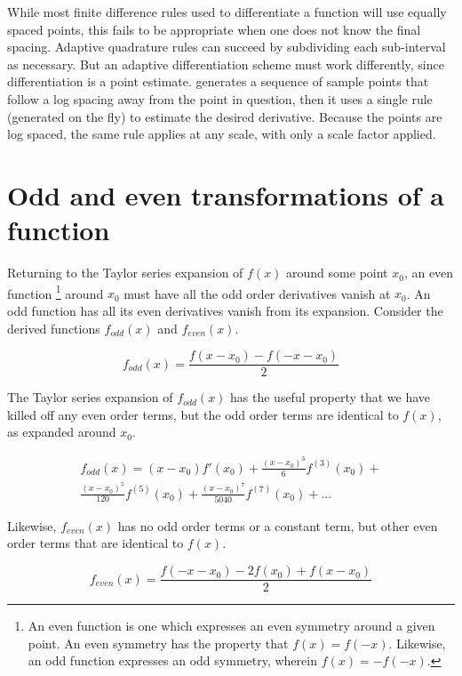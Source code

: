 \documentclass[a4paper,11pt]{article}
\begin{document}
While most finite difference rules used to differentiate a function will use equally spaced points,
this fails to be appropriate when one does not know the final spacing. Adaptive quadrature
rules can succeed by subdividing each sub-interval as necessary. But an adaptive
differentiation scheme must work differently, since differentiation is a point estimate.
 generates a sequence of sample points that follow a log spacing away
from the point in question, then it uses a single rule (generated on the fly) to estimate the
desired derivative. Because the points are log spaced, the same rule applies at any scale,
with only a scale factor applied.


\bigskip

\section{Odd and even transformations of a function}

Returning to the Taylor series expansion of $f(x)$ around some point $x_0$, an even function \footnote{An even function is one which expresses an even symmetry around a given point. An even symmetry has the property that $f(x) = f(-x)$. Likewise, an odd function expresses an odd symmetry, wherein $f(x) = -f(-x)$.} around $x_0$ must have all the odd order derivatives vanish at $x_0$. An odd function has all its even derivatives vanish from its expansion. Consider the derived functions $f_{odd}(x)$ and $f_{even}(x)$.

\begin{equation} \tag{5}
f_{odd}(x) = \frac{f(x - x_0) - f(-x - x_0)}{2} 
\end{equation}

The Taylor series expansion of $f_{odd}(x)$ has the useful property that we have killed off any even order terms, but the odd order terms are identical to $f(x)$, as expanded around $x_0$.

\begin{multline} \tag{6}
f_{odd}(x) = (x - x_0)f'(x_0) + \frac{(x - x_0)^3}{6} f^{(3)}(x_0) + \\
\frac{(x - x_0)^5}{120} f^{(5)}(x_0) + \frac{(x - x_0)^7}{5040} f^{(7)}(x_0) +...
\end{multline}

Likewise, $f_{even}(x)$ has no odd order terms or a constant term, but other even order terms that are
identical to $f(x)$.

\begin{equation} \tag{7}
f_{even}(x) = \frac{f(-x-x_0) - 2f(x_0) + f(x-x_0)}{2}
\end{equation}
\end{document}
